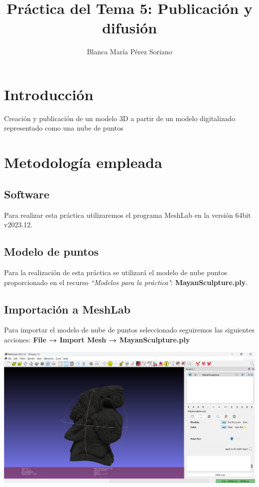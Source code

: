 \documentclass[options]{article}
\title{Práctica del Tema 5: Publicación y difusión}
\author{Blanca María Pérez Soriano}
\begin{document}
\maketitle

\pagebreak

\tableofcontents

\pagebreak

\section{Introducción}
Creación y publicación de un modelo 3D a partir de un modelo digitalizado representado como una nube de puntos


\section{Metodología empleada}
\subsection{Software}
Para realizar esta práctica utilizaremos el programa MeshLab en la versión 64bit v2023.12.
\subsection{Modelo de puntos}
Para la realización de esta práctica se utilizará el modelo de nube puntos proporcionado en el recurso \textit{``Modelos para la práctica"}: \textbf{MayanSculpture.ply}.
\subsection{Importación a MeshLab}
Para importar el modelo de nube de puntos seleccionado seguiremos las siguientes acciones: \textbf{File → Import Mesh → MayanSculpture.ply}
\begin{center}
    \includegraphics[scale=0.35]{images/presentacion_importacion.png}    
\end{center}
\end{document}
